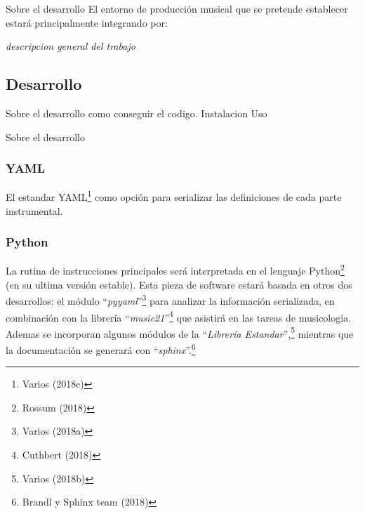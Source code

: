\documentclass[]{article}
\begin{document}
\begin{center}
     
\end{center}

Sobre el desarrollo El entorno de producción musical que se pretende
establecer estará principalmente integrando por:

\emph{descripcion general del trabajo}

\hypertarget{desarrollo}{%
\subsection{Desarrollo}\label{desarrollo}}

Sobre el desarrollo como conseguir el codigo. Instalacion Uso

Sobre el desarrollo

\hypertarget{yaml}{%
\subsubsection{YAML}\label{yaml}}

El estandar YAML\footnote{Varios (2018c)} como opción para serializar
las definiciones de cada parte instrumental.

\hypertarget{python}{%
\subsubsection{Python}\label{python}}

La rutina de instrucciones principales será interpretada en el lenguaje
Python\footnote{Rossum (2018)} (en su ultima versión estable). Esta
pieza de software estará basada en otros dos desarrollos: el módulo
``\emph{pyyaml}''\footnote{Varios (2018a)} para analizar la información
serializada, en combinación con la librería ``\emph{music21}''\footnote{Cuthbert
  (2018)} que asistirá en las tareas de musicología. Ademas se
incorporan algunos módulos de la ``\emph{Librería Estandar}'',\footnote{Varios
  (2018b)} mientras que la documentación se generará con
``\emph{sphinx}''.\footnote{Brandl y Sphinx team (2018)}
\end{document}
